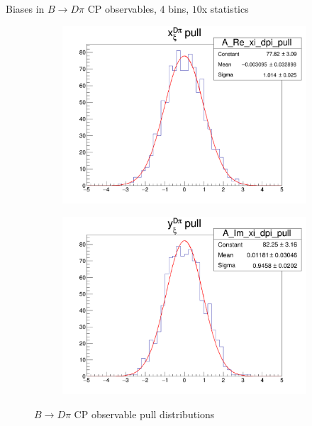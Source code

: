 \documentclass{beamer}
\begin{document}
\begin{frame}{Biases in $B\to D\pi$ CP observables, $4$ bins, $10$x statistics}
  \begin{figure}
    \centering
    \vspace{-0.2cm}
    \begin{subfigure}{0.5\textwidth}
      \includegraphics[width = 1.0\textwidth]{A_Re_xi_dpi_4Bins_StatsMultiplier10_pull.png}
    \end{subfigure}%
    \begin{subfigure}{0.5\textwidth}
      \includegraphics[width = 1.0\textwidth]{A_Im_xi_dpi_4Bins_StatsMultiplier10_pull.png}
    \end{subfigure}
    \caption{$B\to D\pi$ CP observable pull distributions}
  \end{figure}
\end{frame}
\end{document}
